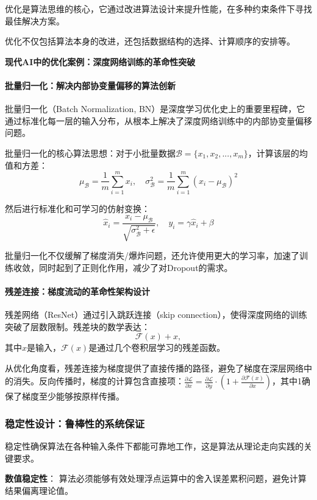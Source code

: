 优化是算法思维的核心，它通过改进算法设计来提升性能，在多种约束条件下寻找最佳解决方案。

优化不仅包括算法本身的改进，还包括数据结构的选择、计算顺序的安排等。

\textbf{现代AI中的优化案例：深度网络训练的革命性突破}

\paragraph{批量归一化：解决内部协变量偏移的算法创新}
批量归一化（Batch Normalization, BN）是深度学习优化史上的重要里程碑，它通过标准化每一层的输入分布，从根本上解决了深度网络训练中的内部协变量偏移问题。

批量归一化的核心算法思想：对于小批量数据$\mathcal{B} = \{x_1, x_2, ..., x_m\}$，计算该层的均值和方差：
$$\mu_{\mathcal{B}} = \frac{1}{m}\sum_{i=1}^{m} x_i, \quad \sigma_{\mathcal{B}}^2 = \frac{1}{m}\sum_{i=1}^{m}(x_i - \mu_{\mathcal{B}})^2$$

然后进行标准化和可学习的仿射变换：
$$\hat{x}_i = \frac{x_i - \mu_{\mathcal{B}}}{\sqrt{\sigma_{\mathcal{B}}^2 + \epsilon}}, \quad y_i = \gamma\hat{x}_i + \beta$$

批量归一化不仅缓解了梯度消失/爆炸问题，还允许使用更大的学习率，加速了训练收敛，同时起到了正则化作用，减少了对Dropout的需求。

\paragraph{残差连接：梯度流动的革命性架构设计}
残差网络（ResNet）通过引入跳跃连接（skip connection），使得深度网络的训练突破了层数限制。残差块的数学表达：
$$\mathcal{F}(x) + x,$$
其中$x$是输入，$\mathcal{F}(x)$是通过几个卷积层学习的残差函数。

从优化角度看，残差连接为梯度提供了直接传播的路径，避免了梯度在深层网络中的消失。反向传播时，梯度的计算包含直接项：$\frac{\partial \mathcal{L}}{\partial x} = \frac{\partial \mathcal{L}}{\partial y} \cdot (1 + \frac{\partial \mathcal{F}(x)}{\partial x})$，其中1确保了梯度至少能够按原样传播。

\subsubsection{稳定性设计：鲁棒性的系统保证}

稳定性确保算法在各种输入条件下都能可靠地工作，这是算法从理论走向实践的关键要求。

\textbf{数值稳定性}：
算法必须能够有效处理浮点运算中的舍入误差累积问题，避免计算结果偏离理论值。

